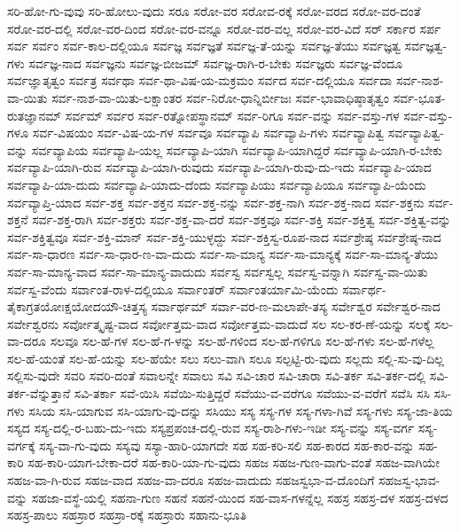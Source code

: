 {ಸರಿ-ಹೋ-ಗು-ವುವು
ಸರಿ-ಹೋಲು-ವುದು
ಸರೂ
ಸರೋ-ವರ
ಸರೋವ-ರಕ್ಕೆ
ಸರೋ-ವರದ
ಸರೋ-ವರ-ದಂತೆ
ಸರೋ-ವರ-ದಲ್ಲಿ
ಸರೋ-ವರ-ದಿಂದ
ಸರೋ-ವರ-ವನ್ನೂ
ಸರೋ-ವರ-ವಲ್ಲ
ಸರೋ-ವರ-ವಿದೆ
ಸರ್
ಸರ್ಕಾರ
ಸರ್ಪ
ಸರ್ವ
ಸರ್ವಂ
ಸರ್ವ-ಕಾಲ-ದಲ್ಲಿಯೂ
ಸರ್ವಜ್ಞ
ಸರ್ವಜ್ಞತೆ
ಸರ್ವಜ್ಞ-ತೆ-ಯನ್ನು
ಸರ್ವಜ್ಞ-ತೆಯು
ಸರ್ವಜ್ಞತ್ವ
ಸರ್ವಜ್ಞತ್ವ-ಗಳು
ಸರ್ವಜ್ಞ-ನಾದ
ಸರ್ವಜ್ಞನು
ಸರ್ವಜ್ಞ-ಬೀಜಮ್
ಸರ್ವಜ್ಞ-ರಾಗಿ-ರ-ಬೇಕು
ಸರ್ವಜ್ಞರು
ಸರ್ವಜ್ಞ-ವೆಂದೂ
ಸರ್ವಜ್ಞಾತೃತ್ವಂ
ಸರ್ವತ್ರ
ಸರ್ವಥಾ
ಸರ್ವ-ಥಾ-ವಿಷ-ಯ-ಮಕ್ರಮಂ
ಸರ್ವದ
ಸರ್ವ-ದಲ್ಲಿಯೂ
ಸರ್ವದಾ
ಸರ್ವ-ನಾಶ-ವಾ-ಯಿತು
ಸರ್ವ-ನಾಶ-ವಾ-ಯಿತು-ಲಕ್ಷಾಂತರ
ಸರ್ವ-ನಿರೋ-ಧಾನ್ನಿರ್ಬೀಜಃ
ಸರ್ವ-ಭಾವಾಧಿಷ್ಠಾತೃತ್ವಂ
ಸರ್ವ-ಭೂತ-ರುತಜ್ಞಾನಮ್
ಸರ್ವಮ್
ಸರ್ವರ
ಸರ್ವ-ರತ್ನೋಪಸ್ಥಾನಮ್
ಸರ್ವ-ರಿಗೂ
ಸರ್ವ-ವನ್ನು
ಸರ್ವ-ವಸ್ತು-ಗಳ
ಸರ್ವ-ವಸ್ತು-ಗಳೂ
ಸರ್ವ-ವಿಷಯಂ
ಸರ್ವ-ವಿಷ-ಯ-ಗಳ
ಸರ್ವವೂ
ಸರ್ವವ್ಯಾಪಿ
ಸರ್ವವ್ಯಾಪಿ-ಗಳು
ಸರ್ವವ್ಯಾಪಿತ್ವ
ಸರ್ವವ್ಯಾಪಿತ್ವ-ವನ್ನು
ಸರ್ವವ್ಯಾಪಿಯ
ಸರ್ವವ್ಯಾಪಿ-ಯಲ್ಲ
ಸರ್ವವ್ಯಾಪಿ-ಯಾಗಿ
ಸರ್ವವ್ಯಾಪಿ-ಯಾಗಿದ್ದರೆ
ಸರ್ವವ್ಯಾಪಿ-ಯಾಗಿ-ರ-ಬೇಕು
ಸರ್ವವ್ಯಾಪಿ-ಯಾಗಿ-ರುವ
ಸರ್ವವ್ಯಾಪಿ-ಯಾಗಿ-ರುವುದು
ಸರ್ವವ್ಯಾಪಿ-ಯಾಗಿ-ರುವು-ದು-ಇದು
ಸರ್ವವ್ಯಾಪಿ-ಯಾದ
ಸರ್ವವ್ಯಾಪಿ-ಯಾ-ದುದು
ಸರ್ವವ್ಯಾಪಿ-ಯಾದು-ದೆಂದು
ಸರ್ವವ್ಯಾಪಿಯು
ಸರ್ವವ್ಯಾಪಿಯೂ
ಸರ್ವವ್ಯಾಪಿ-ಯೆಂದು
ಸರ್ವವ್ಯಾಪ್ತಿ-ಯಾದ
ಸರ್ವ-ಶಕ್ತ
ಸರ್ವ-ಶಕ್ತನ
ಸರ್ವ-ಶಕ್ತ-ನನ್ನು
ಸರ್ವ-ಶಕ್ತ-ನಾಗಿ
ಸರ್ವ-ಶಕ್ತ-ನಾದ
ಸರ್ವ-ಶಕ್ತನು
ಸರ್ವ-ಶಕ್ತನೆ
ಸರ್ವ-ಶಕ್ತ-ರಾಗಿ
ಸರ್ವ-ಶಕ್ತರು
ಸರ್ವ-ಶಕ್ತ-ವಾ-ದರೆ
ಸರ್ವ-ಶಕ್ತವೂ
ಸರ್ವ-ಶಕ್ತಿ
ಸರ್ವ-ಶಕ್ತಿತ್ವ
ಸರ್ವ-ಶಕ್ತಿತ್ವ-ವನ್ನು
ಸರ್ವ-ಶಕ್ತಿತ್ವವೂ
ಸರ್ವ-ಶಕ್ತಿ-ಮಾನ್
ಸರ್ವ-ಶಕ್ತಿ-ಯುಳ್ಳದ್ದು
ಸರ್ವ-ಶಕ್ತಿಸ್ವ-ರೂಪ-ನಾದ
ಸರ್ವಶ್ರೇಷ್ಠ
ಸರ್ವಶ್ರೇಷ್ಠ-ನಾದ
ಸರ್ವ-ಸಾ-ಧಾರಣ
ಸರ್ವ-ಸಾ-ಧಾರ-ಣ-ವಾ-ದುದು
ಸರ್ವ-ಸಾ-ಮಾನ್ಯ
ಸರ್ವ-ಸಾ-ಮಾನ್ಯಕ್ಕೆ
ಸರ್ವ-ಸಾ-ಮಾನ್ಯ-ತೆಯು
ಸರ್ವ-ಸಾ-ಮಾನ್ಯ-ವಾದ
ಸರ್ವ-ಸಾ-ಮಾನ್ಯ-ವಾದುದು
ಸರ್ವಸ್ವ
ಸರ್ವಸ್ವಲ್ಲ
ಸರ್ವಸ್ವ-ವನ್ನಾಗಿ
ಸರ್ವಸ್ವ-ವಾ-ಯಿತು
ಸರ್ವಸ್ವ-ವೆಂದು
ಸರ್ವಾಂತ-ರಾಳ-ದಲ್ಲಿಯೂ
ಸರ್ವಾಂತರ್
ಸರ್ವಾಂತರ್ಯಾಮಿ-ಯೆಂದು
ಸರ್ವಾರ್ಥ-ತೈಕಾಗ್ರತಯೋಃಕ್ಷಯೋದಯೌ-ಚಿತ್ತಸ್ಯ
ಸರ್ವಾರ್ಥಮ್
ಸರ್ವಾ-ವರ-ಣ-ಮಲಾಪೇ-ತಸ್ಯ
ಸರ್ವೇಶ್ವರ
ಸರ್ವೇಶ್ವರ-ನಾದ
ಸರ್ವೇಶ್ವರನು
ಸರ್ವೋತ್ಕೃಷ್ಟ-ವಾದ
ಸರ್ವೋತ್ತಮ-ವಾದ
ಸರ್ವೋತ್ತಮ-ವಾದುದೆ
ಸಲ
ಸಲ-ಕರ-ಣೆ-ಯನ್ನು
ಸಲಕ್ಕೆ
ಸಲ-ವಾ-ದರೂ
ಸಲವೂ
ಸಲ-ಹೆ-ಗಳ
ಸಲ-ಹೆ-ಗ-ಳನ್ನು
ಸಲ-ಹೆ-ಗಳಿಂದ
ಸಲ-ಹೆ-ಗಳಿಗೂ
ಸಲ-ಹೆ-ಗಳು
ಸಲ-ಹೆ-ಗಳೆಲ್ಲ
ಸಲ-ಹೆ-ಯಂತೆ
ಸಲ-ಹೆ-ಯನ್ನು
ಸಲ-ಹೆಯೇ
ಸಲು
ಸಲು-ವಾಗಿ
ಸಲೂ
ಸಲ್ಪಟ್ಟಿ-ರು-ವುದು
ಸಲ್ಲದು
ಸಲ್ಲಿ-ಸು-ವು-ದಿಲ್ಲ
ಸಲ್ಲಿಸು-ವುದೇ
ಸವರಿ
ಸವರಿ-ದಂತೆ
ಸವಾಲನ್ನೇ
ಸವಾಲು
ಸವಿ
ಸವಿ-ಚಾರ
ಸವಿ-ಚಾರಾ
ಸವಿ-ತರ್ಕ
ಸವಿ-ತರ್ಕ-ದಲ್ಲಿ
ಸವಿ-ತರ್ಕ-ವೆನ್ನುತ್ತಾನೆ
ಸವಿ-ತರ್ಕಾ
ಸವೆ-ಯಿಸಿ
ಸವೆಯಿ-ಸುತ್ತಿದ್ದರೆ
ಸವೆಯು-ವ-ವರೆಗೂ
ಸವೆಯು-ವ-ವರೆಗೆ
ಸವೆಸಿ
ಸಸಿ
ಸಸಿ-ಗಳು
ಸಸಿಯ
ಸಸಿ-ಯಾಗುವ
ಸಸಿ-ಯಾಗು-ವು-ದನ್ನು
ಸಸಿಯು
ಸಸ್ಯ
ಸಸ್ಯ-ಗಳ
ಸಸ್ಯ-ಗಳಾ-ಗಿವೆ
ಸಸ್ಯ-ಗಳು
ಸಸ್ಯ-ಜಾ-ತಿಯ
ಸಸ್ಯದ
ಸಸ್ಯ-ದಲ್ಲಿ-ರ-ಬಹು-ದು-ಇದು
ಸಸ್ಯಪ್ರಪಂಚ-ದಲ್ಲಿ-ರುವ
ಸಸ್ಯ-ರಾಶಿ-ಗಳು-ಇಡೀ
ಸಸ್ಯ-ವನ್ನು
ಸಸ್ಯ-ವರ್ಗ
ಸಸ್ಯ-ವರ್ಗಕ್ಕೆ
ಸಸ್ಯ-ವಾ-ಗು-ವುದು
ಸಸ್ಯವು
ಸಸ್ಯಾ-ಹಾರಿ-ಯಾಗದೇ
ಸಹ
ಸಹ-ಕರಿ-ಸಲಿ
ಸಹ-ಕಾರದ
ಸಹ-ಕಾರ-ವನ್ನು
ಸಹ-ಕಾರಿ
ಸಹ-ಕಾರಿ-ಯಾಗ-ಬೇಕಾ-ದರೆ
ಸಹ-ಕಾರಿ-ಯಾ-ಗು-ವುದು
ಸಹಜ
ಸಹಜ-ಗುಣ-ವಾಗು-ವಂತೆ
ಸಹಜ-ವಾಗಿಯೇ
ಸಹಜ-ವಾ-ಗಿ-ರುವ
ಸಹಜ-ವಾದ
ಸಹಜ-ವಾ-ದರೂ
ಸಹಜ-ವಾದುದು
ಸಹಜಸ್ವಭಾ-ವ-ದೊಂದಿಗೆ
ಸಹಜಸ್ವ-ಭಾವ-ವನ್ನು
ಸಹಜಾ-ವಸ್ಥೆ-ಯಲ್ಲಿ
ಸಹನಾ-ಗುಣ
ಸಹನೆ
ಸಹನೆ-ಯಿಂದ
ಸಹ-ವಾಸ-ಗಳನ್ನೆಲ್ಲ
ಸಹಸ್ರ
ಸಹಸ್ರ-ದಳ
ಸಹಸ್ರ-ದಳದ
ಸಹಸ್ರ-ಪಾಲು
ಸಹಸ್ರಾರ
ಸಹಸ್ರಾ-ರಕ್ಕೆ
ಸಹಸ್ರಾರು
ಸಹಾನು-ಭೂತಿ
}
